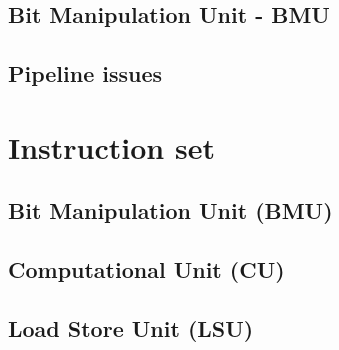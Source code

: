 \documentclass[11pt]{book}
\begin{document}
\section{Bit Manipulation Unit - BMU}

\section{Pipeline issues}

\newpage
\chapter{Instruction set}
\newpage
\section{Bit Manipulation Unit (BMU)}

\newpage
\section{Computational Unit (CU)}

\newpage
\section{Load Store Unit (LSU)}

\end{document}
